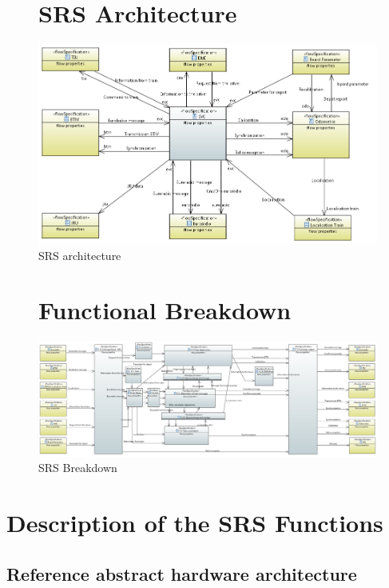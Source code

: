 \documentclass{template/openetcs_report}
\begin{document}
\begin{figure}[hbtp]
\chapter{SRS Architecture}
\centering
\includegraphics[angle=90, scale=0.9] {images/HighLevelArchitecture.png}
\caption{SRS architecture}
\end{figure}



\begin{figure}[hbtp]
\chapter{Functional Breakdown}
\centering
\includegraphics [angle=90, scale=0.45] {images/HighLevelFunctionalbreakdown}
\caption{SRS Breakdown}
\end{figure}
\newpage



\chapter{Description of the SRS Functions}
\label{SRSFunction}

\section{Reference abstract hardware architecture}
\end{document}
